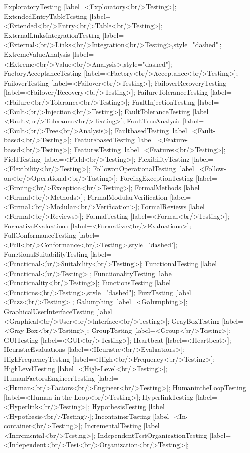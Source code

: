 \documentclass{article}
\begin{document}
{ExploratoryTesting [label=<Exploratory<br/>Testing>];
ExtendedEntryTableTesting [label=<Extended<br/>Entry<br/>Table<br/>Testing>];
ExternalLinksIntegrationTesting [label=<External<br/>Links<br/>Integration<br/>Testing>,style="dashed"];
ExtremeValueAnalysis [label=<Extreme<br/>Value<br/>Analysis>,style="dashed"];
FactoryAcceptanceTesting [label=<Factory<br/>Acceptance<br/>Testing>];
FailoverTesting [label=<Failover<br/>Testing>];
FailoverRecoveryTesting [label=<Failover/Recovery<br/>Testing>];
FailureToleranceTesting [label=<Failure<br/>Tolerance<br/>Testing>];
FaultInjectionTesting [label=<Fault<br/>Injection<br/>Testing>];
FaultToleranceTesting [label=<Fault<br/>Tolerance<br/>Testing>];
FaultTreeAnalysis [label=<Fault<br/>Tree<br/>Analysis>];
FaultbasedTesting [label=<Fault-based<br/>Testing>];
FeaturebasedTesting [label=<Feature-based<br/>Testing>];
FeaturesTesting [label=<Features<br/>Testing>];
FieldTesting [label=<Field<br/>Testing>];
FlexibilityTesting [label=<Flexibility<br/>Testing>];
FollowonOperationalTesting [label=<Follow-on<br/>Operational<br/>Testing>];
ForcingExceptionTesting [label=<Forcing<br/>Exception<br/>Testing>];
FormalMethods [label=<Formal<br/>Methods>];
FormalModularVerification [label=<Formal<br/>Modular<br/>Verification>];
FormalReviews [label=<Formal<br/>Reviews>];
FormalTesting [label=<Formal<br/>Testing>];
FormativeEvaluations [label=<Formative<br/>Evaluations>];
FullConformanceTesting [label=<Full<br/>Conformance<br/>Testing>,style="dashed"];
FunctionalSuitabilityTesting [label=<Functional<br/>Suitability<br/>Testing>];
FunctionalTesting [label=<Functional<br/>Testing>];
FunctionalityTesting [label=<Functionality<br/>Testing>];
FunctionsTesting [label=<Functions<br/>Testing>,style="dashed"];
FuzzTesting [label=<Fuzz<br/>Testing>];
Galumphing [label=<Galumphing>];
GraphicalUserInterfaceTesting [label=<Graphical<br/>User<br/>Interface<br/>Testing>];
GrayBoxTesting [label=<Gray-Box<br/>Testing>];
GroupTesting [label=<Group<br/>Testing>];
GUITesting [label=<GUI<br/>Testing>];
Heartbeat [label=<Heartbeat>];
HeuristicEvaluations [label=<Heuristic<br/>Evaluations>];
HighFrequencyTesting [label=<High<br/>Frequency<br/>Testing>];
HighLevelTesting [label=<High-Level<br/>Testing>];
HumanFactorsEngineerTesting [label=<Human<br/>Factors<br/>Engineer<br/>Testing>];
HumanintheLoopTesting [label=<Human-in-the-Loop<br/>Testing>];
HyperlinkTesting [label=<Hyperlink<br/>Testing>];
HypothesisTesting [label=<Hypothesis<br/>Testing>];
IncontainerTesting [label=<In-container<br/>Testing>];
IncrementalTesting [label=<Incremental<br/>Testing>];
IndependentTestOrganizationTesting [label=<Independent<br/>Test<br/>Organization<br/>Testing>];
}
\end{document}

